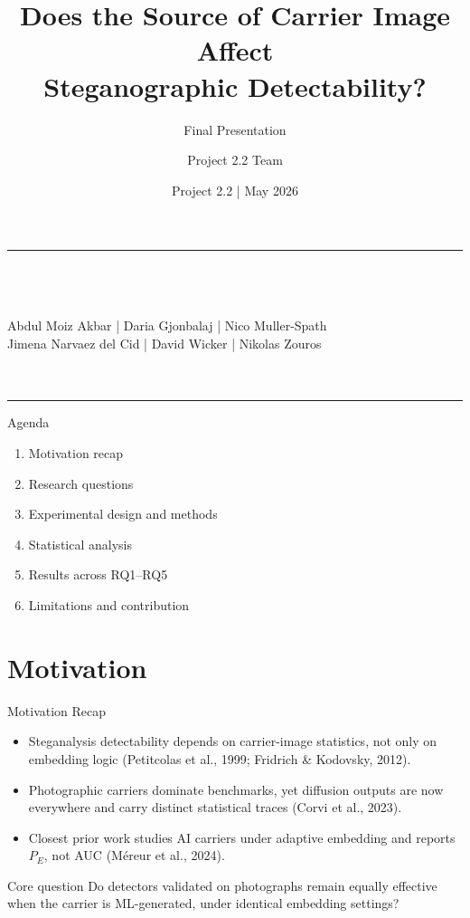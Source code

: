 \documentclass[aspectratio=169,11pt]{beamer}
\title{Does the Source of Carrier Image Affect\\Steganographic Detectability?}
\subtitle{Final Presentation}
\author[Project 2.2 Team]{Project 2.2 Team}
\institute{Department of Advanced Computing Sciences\\Maastricht University}
\date{Project 2.2 \;|\; May 2026}
\newcommand{\icite}[1]{{\footnotesize\color{umgray!85}#1}}
\newcommand{\teamauthors}{Abdul Moiz Akbar \;|\; Daria Gjonbalaj \;|\; Nico Muller-Spath\\Jimena Narvaez del Cid \;|\; David Wicker \;|\; Nikolas Zouros}
\begin{document}
\begin{frame}[plain]
\vfill
\begin{center}
{\color{umorange}\rule{0.42\textwidth}{2pt}}\\[12pt]
{\LARGE\bfseries\color{umdark}\inserttitle}\\[10pt]
{\normalsize\color{umgray}\insertsubtitle}\\[16pt]
{\small\color{umdark}\teamauthors}\\[8pt]
{\small\color{umorange}\insertinstitute}\\[8pt]
{\footnotesize\color{umgray}\insertdate}\\[12pt]
{\color{umorange}\rule{0.42\textwidth}{2pt}}
\end{center}
\vfill
\end{frame}

\begin{frame}{Agenda}
\small
\begin{enumerate}
\item Motivation recap
\item Research questions
\item Experimental design and methods
\item Statistical analysis
\item Results across RQ1--RQ5
\item Limitations and contribution
\end{enumerate}
\end{frame}

\section{Motivation}
\begin{frame}{Motivation Recap}
\small
\begin{itemize}
\item Steganalysis detectability depends on carrier-image statistics, not only on embedding logic \icite{(Petitcolas et al., 1999; Fridrich \& Kodovsky, 2012).}
\item Photographic carriers dominate benchmarks, yet diffusion outputs are now everywhere and carry distinct statistical traces \icite{(Corvi et al., 2023).}
\item Closest prior work studies AI carriers under adaptive embedding and reports $P_E$, not AUC \icite{(M\'ereur et al., 2024).}
\end{itemize}
\vspace{0.1cm}
\begin{alertblock}{Core question}
Do detectors validated on photographs remain equally effective when the carrier is ML-generated, under identical embedding settings?
\end{alertblock}
\end{frame}
\end{document}
